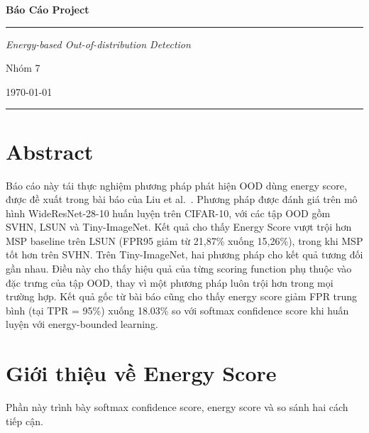 \documentclass[12pt,a4paper]{article}
\begin{document}
\begin{titlepage}
  \centering
  \vspace*{2cm}
  {\LARGE\bfseries Báo Cáo Project\par}
  \vspace{0.5cm}
  \rule{0.6\textwidth}{0.8pt}
  \vspace{1.5cm}

  {\large\itshape Energy-based Out-of-distribution Detection\par}
  \vspace{2cm}

  {\large Nhóm 7\par}
  \vspace{0.8cm}
  {\large \today\par}

  \vfill
  \rule{0.4\textwidth}{0.4pt}
\end{titlepage}

\thispagestyle{empty}
\newpage

\tableofcontents
\newpage

\section{Abstract}

Báo cáo này tái thực nghiệm phương pháp phát hiện OOD dùng energy score, được đề xuất trong bài báo của Liu et al.~\cite{energyood}. Phương pháp được đánh giá trên mô hình WideResNet-28-10 huấn luyện trên CIFAR-10, với các tập OOD gồm SVHN, LSUN và Tiny-ImageNet. Kết quả cho thấy Energy Score vượt trội hơn MSP baseline trên LSUN (FPR95 giảm từ 21,87\% xuống 15,26\%), trong khi MSP tốt hơn trên SVHN. Trên Tiny-ImageNet, hai phương pháp cho kết quả tương đối gần nhau. Điều này cho thấy hiệu quả của từng scoring function phụ thuộc vào đặc trưng của tập OOD, thay vì một phương pháp luôn trội hơn trong mọi trường hợp. Kết quả gốc từ bài báo \cite{energyood} cũng cho thấy energy score giảm FPR trung bình (tại TPR = 95\%) xuống 18.03\% so với softmax confidence score khi huấn luyện với energy-bounded learning.

\section{Giới thiệu về Energy Score}
Phần này trình bày softmax confidence score, energy score và so sánh hai cách tiếp cận. 
\end{document}
